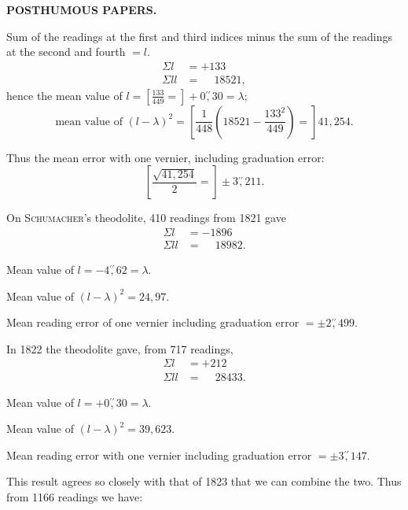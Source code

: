 \par\clearpage
\noindent{}\hfill{\small\textbf{POSTHUMOUS PAPERS.}}\hfill\null\par\medskip
\par\noindent\hspace*{\parindent}Sum of the readings at the first and third indices minus the sum of the readings at the second and fourth $=l$.
\[
\begin{aligned}
\Sigma l&=+133\\
\Sigma ll&=\phantom{+}18521,
\end{aligned}
\]
\noindent hence the mean value of $l=\left[\frac{133}{449}=\right]+0\overset{\prime\prime}{,}30=\lambda$;
\[
\text{mean value of }(l-\lambda)^2=
\left[\frac{1}{448}\left(18521-\frac{133^2}{449}\right)=\right]41{,}254.
\]
\par\noindent\hspace*{\parindent}Thus the mean error with one vernier, including graduation error:
\[
\left[\frac{\sqrt{41{,}254}}{2}=\right]\pm3\overset{\prime\prime}{,}211.
\]
\par\noindent\hspace*{\parindent}On \textsc{Schumacher}'s theodolite, 410 readings from 1821 gave
\[
\begin{aligned}
\Sigma l&=-1896\\
\Sigma ll&=\phantom{-}18982.
\end{aligned}
\]
\par\noindent\hspace*{\parindent}Mean value of $l=-4\overset{\prime\prime}{,}62=\lambda$.
\par\noindent\hspace*{\parindent}Mean value of $(l-\lambda)^2=24{,}97$.
\par\noindent\hspace*{\parindent}Mean reading error of one vernier including graduation error $=\pm2\overset{\prime\prime}{,}499$.
\par\bigskip\bigskip
\par\noindent\hspace*{\parindent}In 1822 the theodolite gave, from 717 readings,
\[
\begin{aligned}
\Sigma l&=+212\\
\Sigma ll&=\phantom{+}28433.
\end{aligned}
\]
\par\noindent\hspace*{\parindent}Mean value of $l=+0\overset{\prime\prime}{,}30=\lambda$.
\par\noindent\hspace*{\parindent}Mean value of $(l-\lambda)^2=39{,}623$.
\par\noindent\hspace*{\parindent}Mean reading error with one vernier including graduation error $=\pm3\overset{\prime\prime}{,}147$.
\par\bigskip\bigskip
\par\noindent\hspace*{\parindent}This result agrees so closely with that of 1823 that we can combine the two. Thus from 1166 readings we have:

